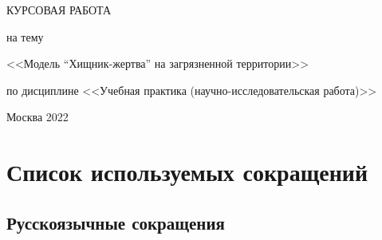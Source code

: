 \documentclass[
  13pt,
  fontsize=13pt,
  russian,
  a4paper,
,captions=tableheading
]{scrreprt}
\begin{document}
\begin{titlepage}
  \bigskip
  \bigskip

  \approvedStamp

  \bigskip
  \bigskip

  \begin{center}
  
        \MakeUppercase{Курсовая работа} \par
    \smallskip
            на тему \par
    \smallskip
            <<Модель ``Хищник-жертва'' на загрязненной территории>>\par
    \smallskip
        \medskip%
    по дисциплине
    <<Учебная практика (научно-исследовательская работа)>>
    \bigskip
      \end{center}

  \vspace{\fill}
  
  \bigskip%
  \authorTable


  \begin{center}
    \vspace*{\fill}
    {Москва}
    {2022}
  \end{center}
  
\end{titlepage}
\restoregeometry




\renewcommand*\contentsname{Содержание}
{
\setcounter{tocdepth}{2}
\tableofcontents
}
\listoftables
\listoffigures
{}
\hypertarget{ux441ux43fux438ux441ux43eux43a-ux438ux441ux43fux43eux43bux44cux437ux443ux435ux43cux44bux445-ux441ux43eux43aux440ux430ux449ux435ux43dux438ux439}{%
\chapter*{Список используемых
сокращений}\label{ux441ux43fux438ux441ux43eux43a-ux438ux441ux43fux43eux43bux44cux437ux443ux435ux43cux44bux445-ux441ux43eux43aux440ux430ux449ux435ux43dux438ux439}}

\hypertarget{ux440ux443ux441ux441ux43aux43eux44fux437ux44bux447ux43dux44bux435-ux441ux43eux43aux440ux430ux449ux435ux43dux438ux44f}{%
\section*{Русскоязычные
сокращения}\label{ux440ux443ux441ux441ux43aux43eux44fux437ux44bux447ux43dux44bux435-ux441ux43eux43aux440ux430ux449ux435ux43dux438ux44f}}
\end{document}
